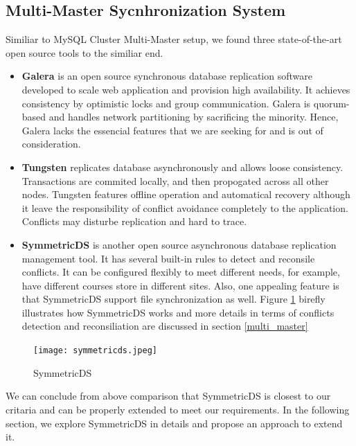 \subsection{Multi-Master Sycnhronization System} 
Similiar to MySQL Cluster Multi-Master setup, we found three state-of-the-art open source tools to the similiar end.
\begin{itemize}
\item \textbf{Galera}\cite{galera} is an open source synchronous database replication software developed to scale web application and provision high availability. It achieves consistency by optimistic locks and group communication. Galera is quorum-based and handles network partitioning by sacrificing the minority. Hence, Galera lacks the essencial features that we are seeking for and is out of consideration.
\item \textbf{Tungsten}\cite{tungsten} replicates database asynchronously and allows loose consistency. Transactions are commited locally, and then propogated across all other nodes. Tungsten features offline operation and automatical recovery although it leave the responsibility of conflict avoidance completely to the application. Conflicts may disturbe replication and hard to trace.
\item \textbf{SymmetricDS}\cite{symmetricds} is another open source asynchronous database replication management tool. It has several built-in rules to detect and reconsile conflicts. It can be configured flexibly to meet different needs, for example, have different courses store in different sites. Also, one appealing feature is that SymmetricDS support file synchronization as well. Figure \ref{symmetricds} birefly illustrates how SymmetricDS works and more details in terms of conflicts detection and reconsiliation are discussed in section \ref{multi_master}
\end{itemize}

\begin{figure}[htbp]
\centering
\texttt{[image: symmetricds.jpeg]}
\caption{SymmetricDS}
\label{symmetricds}
\end{figure}

We can conclude from above comparison that SymmetricDS is closest to our critaria and can be properly extended to meet our requirements. In the following section, we explore SymmetricDS in details and propose an approach to extend it.

